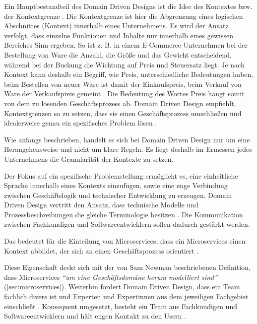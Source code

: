 Ein Hauptbestandteil des Domain Driven Designs ist die Idee des Kontextes bzw. der Kontextgrenze \parencite[vgl.][]{fowler_boundedContext_2014}. Die Kontextgrenze ist hier die Abgrenzung eines logischen Abschnittes (Kontext) innerhalb eines Unternehmens. Es wird der Ansatz verfolgt, dass einzelne Funktionen und Inhalte nur innerhalb eines gewissen Bereiches Sinn ergeben. So ist z. B. in einem E-Commerce Unternehmen bei der Bestellung von Ware die Anzahl, die Größe und das Gewicht entscheidend, während bei der Buchung die Wichtung auf Preis und Steuersatz liegt. Je nach Kontext kann deshalb ein Begriff, wie Preis, unterschiedliche Bedeutungen haben, beim Bestellen von neuer Ware ist damit der Einkaufspreis, beim Verkauf von Ware der Verkaufspreis gemeint \parencite[vgl.][S. 24 ff.]{evans_domain-driven_2003}. Die Bedeutung des Wortes Preis hängt somit von dem zu lösenden Geschäftsprozess ab. Domain Driven Design empfiehlt, Kontextgrenzen so zu setzen, dass sie einen Geschäftsprozess umschließen und idealerweise genau ein spezifisches Problem lösen \parencite[vgl.][Kap. 4.3]{wolff_microservices_2018}.

Wie anfangs beschrieben, handelt es sich bei Domain Driven Design nur um eine Herangehensweise und nicht um klare Regeln. Es liegt deshalb im Ermessen jedes Unternehmens die Granularität der Kontexte zu setzen.

Der Fokus auf ein spezifische Problemstellung ermöglicht es, eine einheitliche Sprache innerhalb eines Kontexts einzufügen, sowie eine enge Verbindung zwischen Geschäftslogik und technischer Entwicklung zu erzeugen. Domain Driven Design vertritt den Ansatz, dass technische Modelle und Prozessbeschreibungen die gleiche Terminologie besitzen \parencite[vgl.][S. 24 ff.]{evans_domain-driven_2003}. Die Kommunikation zwischen Fachkundigen und Softwareentwicklern sollen dadurch gestärkt werden.

Das bedeutet für die Einteilung von Microservices, dass ein Microservices einen Kontext abbildet, der sich an einen Geschäftsprozess orientiert \parencites[vgl.][Kap. 4.3]{wolff_microservices_2018}[vgl.][Kap. 4]{newman_monolith_2019}.

Diese Eigenschaft deckt sich mit der von Sam Newman beschriebenen Definition, dass Microservices \textit{\enquote{um eine Geschäftsdomäne herum modelliert sind}} (\cref{sec:microservices}). Weiterhin fordert Domain Driven Design, dass ein Team fachlich divers ist und Experten und Expertinnen aus dem jeweiligen Fachgebiet einschließt \parencite[vgl.][S. 32 ff.]{evans_domain-driven_2003}. 
Konsequent umgesetzt, besteht ein Team aus Fachkundigen und Softwareentwicklern und hält engen Kontakt zu den Usern \parencites[vgl.][Kap. 4.3]{wolff_microservices_2018}.

